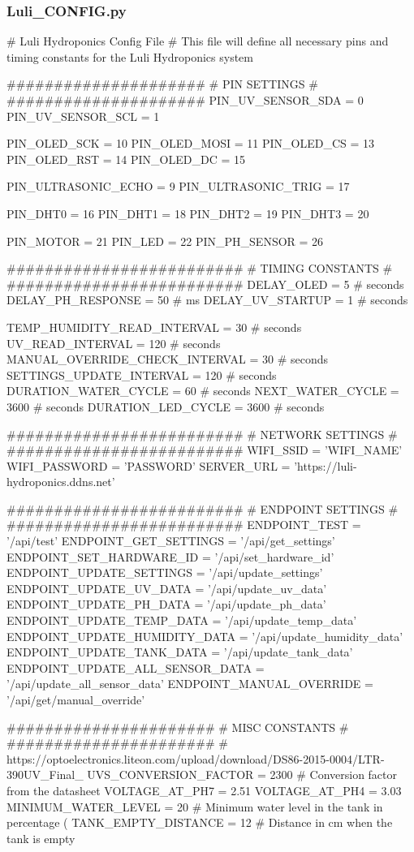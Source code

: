 \documentclass[12pt]{article} %
\begin{document}
\subsubsection{Luli\_CONFIG.py}
\begin{pythoncode}[caption={Pico W Configuration File}, label={lst:config_micropython}]
# Luli Hydroponics Config File
# This file will define all necessary pins and timing constants for the Luli Hydroponics system

#####################
#   PIN SETTINGS    #
#####################
PIN_UV_SENSOR_SDA = 0
PIN_UV_SENSOR_SCL = 1

PIN_OLED_SCK = 10
PIN_OLED_MOSI = 11
PIN_OLED_CS = 13
PIN_OLED_RST = 14
PIN_OLED_DC = 15

PIN_ULTRASONIC_ECHO = 9
PIN_ULTRASONIC_TRIG = 17

PIN_DHT0 = 16
PIN_DHT1 = 18
PIN_DHT2 = 19
PIN_DHT3 = 20

PIN_MOTOR = 21
PIN_LED = 22
PIN_PH_SENSOR = 26




#########################
#   TIMING CONSTANTS    #
#########################
DELAY_OLED = 5 # seconds
DELAY_PH_RESPONSE = 50 # ms
DELAY_UV_STARTUP = 1 # seconds

TEMP_HUMIDITY_READ_INTERVAL = 30 # seconds
UV_READ_INTERVAL = 120 # seconds
MANUAL_OVERRIDE_CHECK_INTERVAL = 30 # seconds
SETTINGS_UPDATE_INTERVAL = 120 # seconds
DURATION_WATER_CYCLE = 60 # seconds
NEXT_WATER_CYCLE = 3600 # seconds
DURATION_LED_CYCLE = 3600 # seconds



#########################
#   NETWORK SETTINGS    #
#########################
WIFI_SSID = 'WIFI_NAME'
WIFI_PASSWORD = 'PASSWORD'
SERVER_URL = 'https://luli-hydroponics.ddns.net'



#########################
#   ENDPOINT SETTINGS   #
#########################
ENDPOINT_TEST = '/api/test'
ENDPOINT_GET_SETTINGS = '/api/get_settings'
ENDPOINT_SET_HARDWARE_ID = '/api/set_hardware_id'
ENDPOINT_UPDATE_SETTINGS = '/api/update_settings'
ENDPOINT_UPDATE_UV_DATA = '/api/update_uv_data'
ENDPOINT_UPDATE_PH_DATA = '/api/update_ph_data'
ENDPOINT_UPDATE_TEMP_DATA = '/api/update_temp_data'
ENDPOINT_UPDATE_HUMIDITY_DATA = '/api/update_humidity_data'
ENDPOINT_UPDATE_TANK_DATA = '/api/update_tank_data'
ENDPOINT_UPDATE_ALL_SENSOR_DATA = '/api/update_all_sensor_data'
ENDPOINT_MANUAL_OVERRIDE = '/api/get/manual_override'


######################
#   MISC CONSTANTS   #
######################
# https://optoelectronics.liteon.com/upload/download/DS86-2015-0004/LTR-390UV_Final_%
UVS_CONVERSION_FACTOR = 2300 # Conversion factor from the datasheet
VOLTAGE_AT_PH7 = 2.51
VOLTAGE_AT_PH4 = 3.03
MINIMUM_WATER_LEVEL = 20 # Minimum water level in the tank in percentage (%
TANK_EMPTY_DISTANCE = 12 # Distance in cm when the tank is empty
\end{pythoncode}
\end{document}
